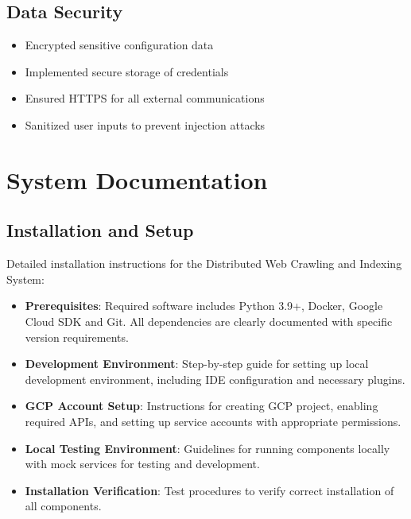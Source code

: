 \documentclass[12pt,a4paper]{report}
\begin{document}
\section{Data Security}
\begin{itemize}
    \item Encrypted sensitive configuration data
    \item Implemented secure storage of credentials
    \item Ensured HTTPS for all external communications
    \item Sanitized user inputs to prevent injection attacks
\end{itemize}

\chapter{System Documentation}

\section{Installation and Setup}
Detailed installation instructions for the Distributed Web Crawling and Indexing System:
\begin{itemize}
    \item \textbf{Prerequisites}: Required software includes Python 3.9+, Docker, Google Cloud SDK and Git. All dependencies are clearly documented with specific version requirements.
    \item \textbf{Development Environment}: Step-by-step guide for setting up local development environment, including IDE configuration and necessary plugins.
    \item \textbf{GCP Account Setup}: Instructions for creating GCP project, enabling required APIs, and setting up service accounts with appropriate permissions.
    \item \textbf{Local Testing Environment}: Guidelines for running components locally with mock services for testing and development.
    \item \textbf{Installation Verification}: Test procedures to verify correct installation of all components.
\end{itemize}
\end{document}

